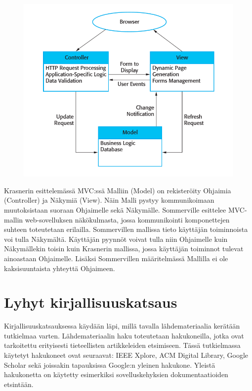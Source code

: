 \documentclass[utf8]{gradu3}
\begin{document}
\begin{figure}[h]
\centering
\includegraphics[scale=0.45]{mvc.png}
\caption{\parencite[s.162]{Sommerville}}
\end{figure}


Krasnerin esittelemässä MVC:ssä Malliin (Model) on rekisteröity Ohjaimia (Controller) ja Näkymiä (View). Näin Malli pystyy kommunikoimaan muutoksistaan suoraan Ohjaimelle sekä Näkymälle.
Sommerville esittelee MVC-mallin web-sovelluksen näkökulmasta, jossa kommunikointi komponettejen suhteen toteutetaan erilailla. Sommervillen mallissa tieto käyttäjän toiminnoista voi tulla 
Näkymältä. Käyttäjän pyynnöt voivat tulla niin Ohjaimelle kuin Näkymällekin toisin kuin Krasnerin mallissa, jossa käyttäjän toiminnot tulevat ainoastaan Ohjaimelle.
Lisäksi Sommervillen määritelmässä Mallilla ei ole kaksisuuntaista yhteyttä Ohjaimeen.

\chapter{Lyhyt kirjallisuuskatsaus}

Kirjallisuuskatsauksessa käydään läpi, millä tavalla lähdemateriaalia kerätään tutkielmaa varten. Lähdemateriaalin 
haku toteutetaan hakukoneilla, jotka ovat tarkoitettu erityisesti 
tieteellisten artikkeleiden etsimiseen. Tässä tutkielmassa käytetyt 
hakukoneet ovat seuraavat: IEEE Xplore, ACM Digital Library, 
Google Scholar sekä joissakin tapauksissa Google:n yleinen
hakukone. Yleistä hakukonetta on käytetty esimerkiksi
sovelluskehyksien dokumentaatioiden etsintään.
\end{document}
